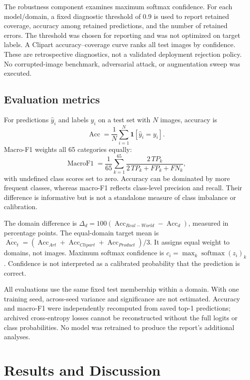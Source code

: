 \documentclass[10pt,a4paper]{article}
\newcommand{\R}{Real-World}
\begin{document}
The robustness component examines maximum softmax confidence. For each model/domain, a fixed diagnostic threshold of 0.9 is used to report retained coverage, accuracy among retained predictions, and the number of retained errors. The threshold was chosen for reporting and was not optimized on target labels. A Clipart accuracy--coverage curve ranks all test images by confidence. These are retrospective diagnostics, not a validated deployment rejection policy. No corrupted-image benchmark, adversarial attack, or augmentation sweep was executed.

\subsection{Evaluation metrics}
For predictions $\hat y_i$ and labels $y_i$ on a test set with $N$ images, accuracy is
\begin{equation}
\operatorname{Acc}=\frac{1}{N}\sum_{i=1}^{N}\mathbf 1[\hat y_i=y_i].
\end{equation}
Macro-F1 weights all 65 categories equally:
\begin{equation}
\operatorname{MacroF1}=\frac{1}{65}\sum_{k=1}^{65}
\frac{2\,TP_k}{2\,TP_k+FP_k+FN_k},
\end{equation}
with undefined class scores set to zero. Accuracy can be dominated by more frequent classes, whereas macro-F1 reflects class-level precision and recall. Their difference is informative but is not a standalone measure of class imbalance or calibration.

The domain difference is $\Delta_d=100(\operatorname{Acc}_{\R}-\operatorname{Acc}_d)$, measured in percentage points. The equal-domain target mean is $\overline{\operatorname{Acc}}_t=(\operatorname{Acc}_{Art}+\operatorname{Acc}_{Clipart}+\operatorname{Acc}_{Product})/3$. It assigns equal weight to domains, not images. Maximum softmax confidence is $c_i=\max_k \operatorname{softmax}(z_i)_k$. Confidence is not interpreted as a calibrated probability that the prediction is correct.

All evaluations use the same fixed test membership within a domain. With one training seed, across-seed variance and significance are not estimated. Accuracy and macro-F1 were independently recomputed from saved top-1 predictions; archived cross-entropy losses cannot be reconstructed without the full logits or class probabilities. No model was retrained to produce the report's additional analyses.


\section{Results and Discussion}
\end{document}
